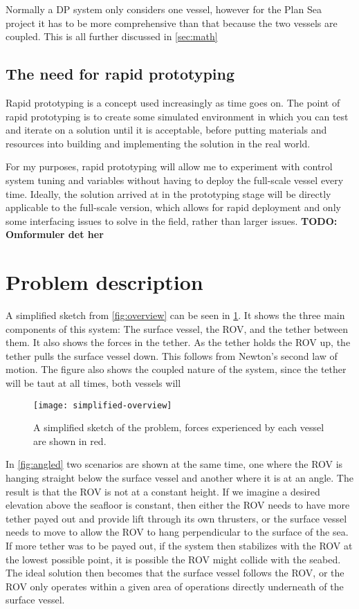 Normally a DP system only considers one vessel, however for the Plan Sea project it has to be more comprehensive than that because the two vessels are coupled. This is all further discussed in \cref{sec:math}

\subsection{The need for rapid prototyping}
Rapid prototyping is a concept used increasingly as time goes on. The point of rapid prototyping is to create some simulated environment in which you can test and iterate on a solution until it is acceptable, before putting materials and resources into building and implementing the solution in the real world. 

For my purposes, rapid prototyping will allow me to experiment with control system tuning and variables without having to deploy the full-scale vessel every time. Ideally, the solution arrived at in the prototyping stage will be directly applicable to the full-scale version, which allows for rapid deployment and only some interfacing issues to solve in the field, rather than larger issues. \textbf{TODO: Omformuler det her}

\section{Problem description}
A simplified sketch from \cref{fig:overview} can be seen in \cref{fig:simple}. It shows the three main components of this system: The surface vessel, the ROV, and the tether between them. It also shows the forces in the tether. As the tether holds the ROV up, the tether pulls the surface vessel down. This follows from Newton's second law of motion. The figure also shows the coupled nature of the system, since the tether will be taut at all times, both vessels will

\begin{figure}
	\centering
	\texttt{[image: simplified-overview]}
	\caption{A simplified sketch of the problem, forces experienced by each vessel are shown in red.}
	\label{fig:simple}
\end{figure}

In \cref{fig:angled} two scenarios are shown at the same time, one where the ROV is hanging straight below the surface vessel and another where it is at an angle. The result is that the ROV is not at a constant height. If we imagine a desired elevation above the seafloor is constant, then either the ROV needs to have more tether payed out and provide lift through its own thrusters, or the surface vessel needs to move to allow the ROV to hang perpendicular to the surface of the sea. If more tether was to be payed out, if the system then stabilizes with the ROV at the lowest possible point, it is possible the ROV might collide with the seabed. The ideal solution then becomes that the surface vessel follows the ROV, or the ROV only operates within a given area of operations directly underneath of the surface vessel. 

